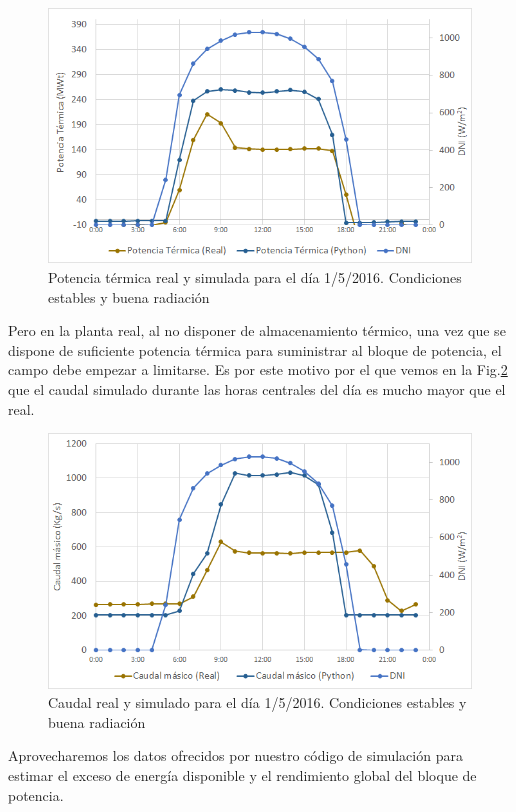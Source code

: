 \begin{figure}[H]
\includegraphics[width=0.9\linewidth]{images/potencia_aste1b_01052016.png}
\caption{Potencia térmica real y simulada para el día 1/5/2016. Condiciones estables y buena radiación} 
\label{fig:potencia_1b}
\end{figure}

Pero en la planta real, al no disponer de almacenamiento térmico, una vez que se dispone de suficiente potencia térmica para suministrar al bloque de potencia, el campo debe empezar a limitarse. Es por este motivo por el que vemos en la Fig.\ref{fig:caudal_1b} que el caudal simulado durante las  horas centrales del día es mucho mayor que el real. 

\begin{figure}[H]
\includegraphics[width=0.9\linewidth]{images/caudal_aste1b_01052016.png}
\caption{Caudal real y simulado para el día 1/5/2016. Condiciones estables y buena radiación} 
\label{fig:caudal_1b}
\end{figure}

Aprovecharemos los datos ofrecidos por nuestro código de simulación para estimar el exceso de energía disponible y el rendimiento global del bloque de potencia.

